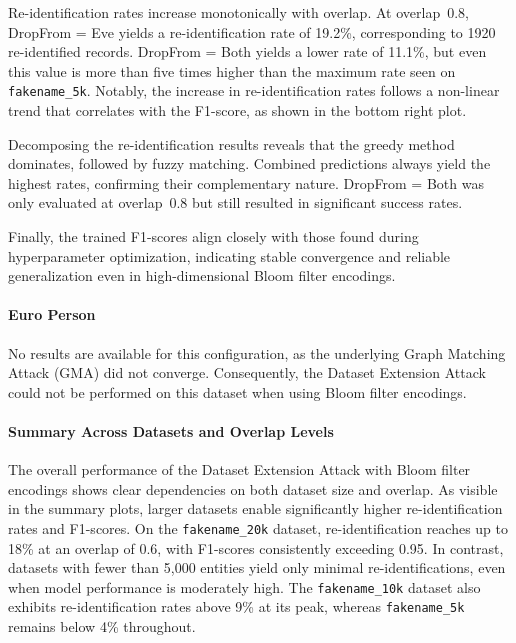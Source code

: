 Re-identification rates increase monotonically with overlap. At overlap~0.8, DropFrom = Eve yields a re-identification rate of 19.2\%, corresponding to 1920 re-identified records. DropFrom = Both yields a lower rate of 11.1\%, but even this value is more than five times higher than the maximum rate seen on \texttt{fakename\_5k}. Notably, the increase in re-identification rates follows a non-linear trend that correlates with the F1-score, as shown in the bottom right plot.

Decomposing the re-identification results reveals that the greedy method dominates, followed by fuzzy matching. Combined predictions always yield the highest rates, confirming their complementary nature. DropFrom = Both was only evaluated at overlap~0.8 but still resulted in significant success rates.

Finally, the trained F1-scores align closely with those found during hyperparameter optimization, indicating stable convergence and reliable generalization even in high-dimensional Bloom filter encodings.


\paragraph{Euro Person}

No results are available for this configuration, as the underlying Graph Matching Attack (GMA) did not converge. Consequently, the Dataset Extension Attack could not be performed on this dataset when using Bloom filter encodings.

\paragraph{Summary Across Datasets and Overlap Levels}

The overall performance of the Dataset Extension Attack with Bloom filter encodings shows clear dependencies on both dataset size and overlap. As visible in the summary plots, larger datasets enable significantly higher re-identification rates and F1-scores. On the \texttt{fakename\_20k} dataset, re-identification reaches up to 18\% at an overlap of 0.6, with F1-scores consistently exceeding 0.95. In contrast, datasets with fewer than 5,000 entities yield only minimal re-identifications, even when model performance is moderately high. The \texttt{fakename\_10k} dataset also exhibits re-identification rates above 9\% at its peak, whereas \texttt{fakename\_5k} remains below 4\% throughout.

